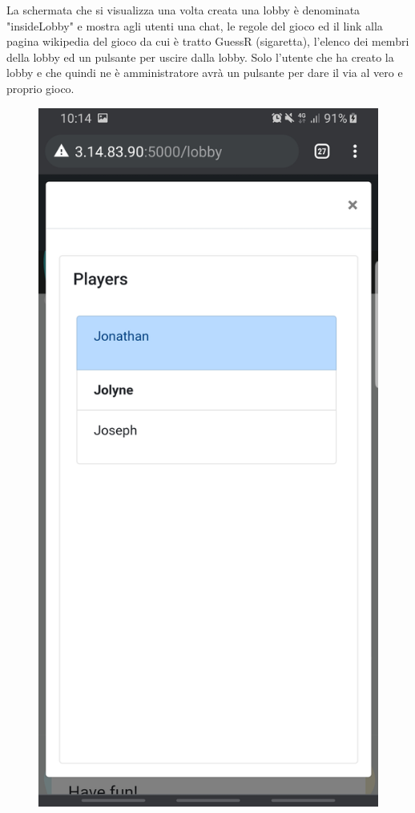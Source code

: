 \noindent La schermata che si visualizza una volta creata una lobby è denominata "insideLobby" e mostra agli utenti una chat, le regole del gioco ed il link alla pagina wikipedia del gioco da cui è tratto GuessR (sigaretta), l'elenco dei membri della lobby ed un pulsante per uscire dalla lobby. Solo l'utente che ha creato la lobby e che quindi ne è amministratore avrà un pulsante per dare il via al vero e proprio gioco. 

 \begin{figure}[H]
  \centering
  \begin{minipage}[b]{0.2\textwidth}
    \includegraphics[width=\textwidth]{img/screen/M players.jpg}

\end{minipage}
\end{figure}
